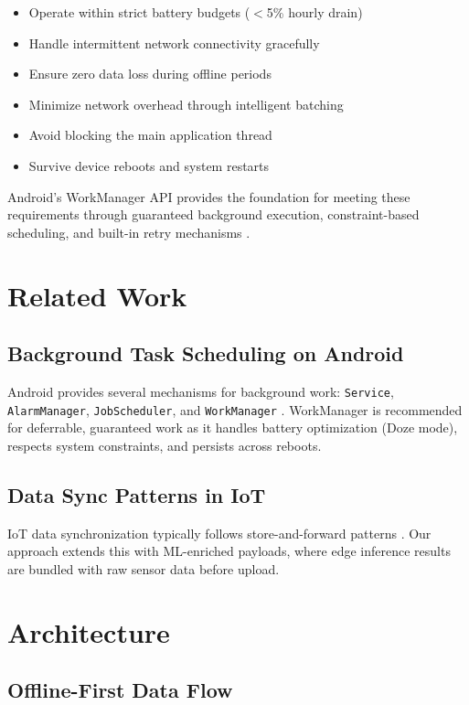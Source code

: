 \documentclass[conference]{IEEEtran}
\begin{document}
\begin{itemize}
    \item Operate within strict battery budgets ($<$5\% hourly drain)
    \item Handle intermittent network connectivity gracefully
    \item Ensure zero data loss during offline periods
    \item Minimize network overhead through intelligent batching
    \item Avoid blocking the main application thread
    \item Survive device reboots and system restarts
\end{itemize}

Android's WorkManager API provides the foundation for meeting these requirements through guaranteed background execution, constraint-based scheduling, and built-in retry mechanisms \cite{workmanager}.

\section{Related Work}
\subsection{Background Task Scheduling on Android}
Android provides several mechanisms for background work: \texttt{Service}, \texttt{AlarmManager}, \texttt{JobScheduler}, and \texttt{WorkManager} \cite{android_bg}. WorkManager is recommended for deferrable, guaranteed work as it handles battery optimization (Doze mode), respects system constraints, and persists across reboots.

\subsection{Data Sync Patterns in IoT}
IoT data synchronization typically follows store-and-forward patterns \cite{iot_sync}. Our approach extends this with ML-enriched payloads, where edge inference results are bundled with raw sensor data before upload.

\section{Architecture}

\subsection{Offline-First Data Flow}
\end{document}
